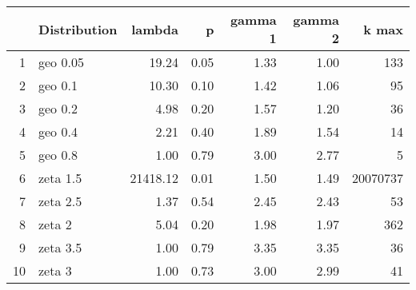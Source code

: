 \begin{table}[ht]
\centering
\begin{tabular}{rlrrrrr}
  \hline
 & Distribution & lambda & p & gamma 1 & gamma 2 & k max \\ 
  \hline
1 & geo 0.05 & 19.24 & 0.05 & 1.33 & 1.00 & 133 \\ 
  2 & geo 0.1 & 10.30 & 0.10 & 1.42 & 1.06 &  95 \\ 
  3 & geo 0.2 & 4.98 & 0.20 & 1.57 & 1.20 &  36 \\ 
  4 & geo 0.4 & 2.21 & 0.40 & 1.89 & 1.54 &  14 \\ 
  5 & geo 0.8 & 1.00 & 0.79 & 3.00 & 2.77 &   5 \\ 
  6 & zeta 1.5 & 21418.12 & 0.01 & 1.50 & 1.49 & 20070737 \\ 
  7 & zeta 2.5 & 1.37 & 0.54 & 2.45 & 2.43 &  53 \\ 
  8 & zeta 2 & 5.04 & 0.20 & 1.98 & 1.97 & 362 \\ 
  9 & zeta 3.5 & 1.00 & 0.79 & 3.35 & 3.35 &  36 \\ 
  10 & zeta 3 & 1.00 & 0.73 & 3.00 & 2.99 &  41 \\ 
   \hline
\end{tabular}
\end{table}
